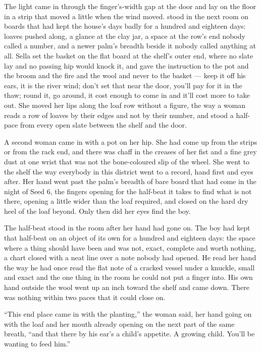 \scenebreak

The light came in through the finger's-width gap at the door and lay on the floor in a strip that moved a little when the wind moved.  stood in the next room on boards that had kept the house's days badly for a hundred and eighteen days: loaves pushed along, a glance at the clay jar, a space at the row's end nobody called a number, and a newer palm's breadth beside it nobody called anything at all. Sella set the basket on the flat board at the shelf's outer end, where no slate lay and no passing hip would knock it, and gave the instruction to the pot and the broom and the fire and the wool and never to the basket --- keep it off his ears, it is the river wind; don't set that near the door, you'll pay for it in the thaw; round it, go around, it cost enough to come in and it'll cost more to take out. She moved her lips along the loaf row without a figure, the way a woman reads a row of loaves by their edges and not by their number, and stood a half-pace from every open slate between the shelf and the door.

A second woman came in with a pot on her hip. She had come up from the strips or from the rack end, and there was chaff in the creases of her fist and a fine grey dust at one wrist that was not the bone-coloured slip of the wheel. She went to the shelf the way everybody in this district went to a record, hand first and eyes after. Her hand went past the palm's breadth of bare board that had come in the night of Seed 6, the fingers opening for the half-beat it takes to find what is not there, opening a little wider than the loaf required, and closed on the hard dry heel of the loaf beyond. Only then did her eyes find the boy.

The half-beat stood in the room after her hand had gone on. The boy had kept that half-beat on an object of its own for a hundred and eighteen days: the space where a thing should have been and was not, exact, complete and worth nothing, a chart closed with a neat line over a note nobody had opened. He read her hand the way he had once read the flat note of a cracked vessel under a knuckle, small and exact and the one thing in the room he could not put a finger into. His own hand outside the wool went up an inch toward the shelf and came down. There was nothing within two paces that it could close on.

“This end place came in with the planting,” the woman said, her hand going on with the loaf and her mouth already opening on the next part of the same breath, “and that there by his ear's a child's appetite. A growing child. You'll be wanting to feed him.”

